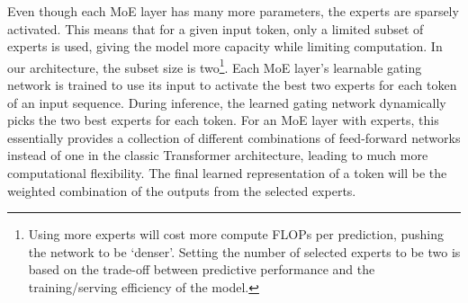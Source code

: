 \documentclass{article}
\begin{document}
Even though each MoE layer has many more parameters, the experts are sparsely activated. This means that for a given input token, only a limited subset of experts is used, giving the model more capacity while limiting computation. In our architecture, the subset size is two\footnote{Using more experts will cost more compute FLOPs per prediction, pushing the network to be `denser'. Setting the number of selected experts to be two is based on the trade-off between predictive performance and the training/serving efficiency of the model.}. Each MoE layer's learnable gating network is trained to use its input to activate the best two experts for each token of an input sequence. During inference, the learned gating network dynamically picks the two best experts for each token. For an MoE layer with  experts, this essentially provides a collection of  different combinations of feed-forward networks instead of one in the classic Transformer architecture, leading to much more computational flexibility.  The final learned representation of a token will be the weighted combination of the outputs from the selected experts. 
\end{document}
